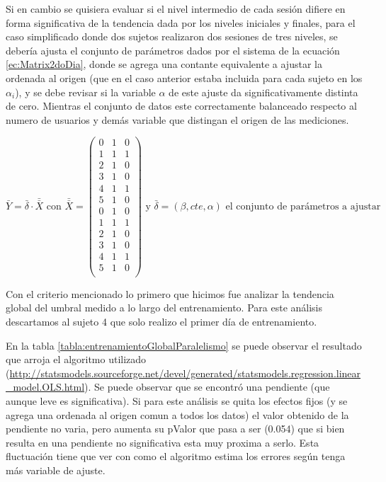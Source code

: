 \documentclass{article}
\begin{document}
    Si en cambio se quisiera evaluar si el nivel intermedio de cada sesión difiere en forma significativa de la tendencia dada por los niveles iniciales y finales, para el caso simplificado donde dos sujetos realizaron dos sesiones de tres niveles, se debería ajusta el conjunto de parámetros dados por el sistema de la ecuación \ref{ec:Matrix2doDia}, donde se agrega una contante equivalente a ajustar la ordenada al origen (que en el caso anterior estaba incluida para cada sujeto en los $\alpha_i$), y se debe revisar si la variable $\alpha$ de este ajuste da significativamente distinta de cero. Mientras el conjunto de datos este correctamente balanceado respecto al numero de usuarios y demás variable que distingan el origen de las mediciones.

    \begin{equation} \label{ec:Matrix2doDia}
    \bar {Y} = \bar{\delta} \cdot \bar{\bar{X}} \text{ con } \bar{\bar{X}} =
     \begin{pmatrix}
        0 & 1 & 0\\
        1 & 1 & 1\\
        2 & 1 & 0\\
        3 & 1 & 0\\
        4 & 1 & 1\\
        5 & 1 & 0\\
        0 & 1 & 0\\
        1 & 1 & 1\\
        2 & 1 & 0\\
        3 & 1 & 0\\
        4 & 1 & 1\\
        5 & 1 & 0\\
     \end{pmatrix} \text{ y $\bar{\delta}=(\beta,cte,\alpha)$ el conjunto de parámetros a ajustar}
    \end{equation}

    Con el criterio mencionado lo primero que hicimos fue analizar la tendencia global del umbral medido a lo largo del entrenamiento. Para este análisis descartamos al sujeto 4 que solo realizo el primer día de entrenamiento. 
    
    En la tabla \ref{tabla:entrenamientoGlobalParalelismo} se puede observar el resultado que arroja el algoritmo utilizado (\url{http://statsmodels.sourceforge.net/devel/generated/statsmodels.regression.linear_model.OLS.html}). Se puede observar que se encontró una pendiente (que aunque leve es significativa). Si para este análisis se quita los efectos fijos (y se agrega una ordenada al origen comun a todos los datos) el valor obtenido de la pendiente no varia, pero aumenta su pValor que pasa a ser (0.054) que si bien resulta en una pendiente no significativa esta muy proxima a serlo. Esta fluctuación tiene que ver con como el algoritmo estima los errores según tenga más variable de ajuste. 
    
\end{document}
